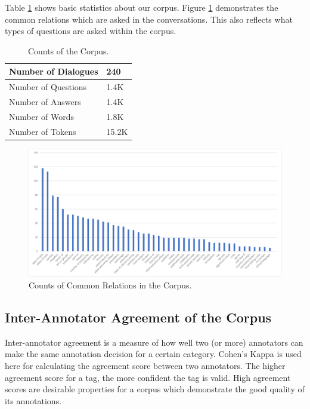 \documentclass[bsc,frontabs,twoside,singlespacing,parskip,deptreport]{infthesis}     %
\begin{document}
Table \ref{tab:datacount} shows basic statistics about our corpus. Figure \ref{fig:relationcount} demonstrates the common relations which are asked in the conversations. This also reflects what types of questions are asked within the corpus.

\begin{table}[]
\centering
\begin{tabular}{|l|l|}
\hline
Number of Dialogues & 240   \\ \hline
Number of Questions & 1.4K  \\ \hline
Number of Answers   & 1.4K  \\ \hline
Number of Words     & 1.8K  \\ \hline
Number of Tokens    & 15.2K \\ \hline
\end{tabular}
\caption{Counts of the Corpus.}
\label{tab:datacount}
\end{table}



\begin{figure}[h]
    \centering
    \includegraphics[width=1.2\textwidth]{graph1.png}
    \caption{Counts of Common Relations in the Corpus.}
    \label{fig:relationcount}
\end{figure}




\subsection*{Inter-Annotator Agreement of the Corpus}

Inter-annotator agreement is a measure of how well two (or more) annotators can make the same annotation decision for a certain category. Cohen's Kappa is used here for calculating the agreement score between two annotators. The higher agreement score for a tag, the more confident the tag is valid. High agreement scores are desirable properties for a corpus which demonstrate the good quality of its annotations.
\end{document}
